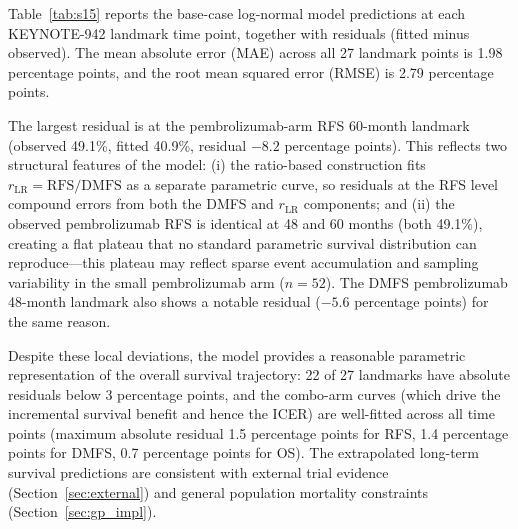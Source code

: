 \documentclass[11pt,a4paper]{article}
\begin{document}
Table~\ref{tab:s15} reports the base-case log-normal model predictions at each KEYNOTE-942 landmark time point, together with residuals (fitted minus observed). The mean absolute error (MAE) across all 27 landmark points is 1.98 percentage points, and the root mean squared error (RMSE) is 2.79 percentage points.

The largest residual is at the pembrolizumab-arm RFS 60-month landmark (observed 49.1\%, fitted 40.9\%, residual $-8.2$ percentage points). This reflects two structural features of the model: (i) the ratio-based construction fits $r_{\text{LR}} = \text{RFS}/\text{DMFS}$ as a separate parametric curve, so residuals at the RFS level compound errors from both the DMFS and $r_{\text{LR}}$ components; and (ii) the observed pembrolizumab RFS is identical at 48 and 60 months (both 49.1\%), creating a flat plateau that no standard parametric survival distribution can reproduce---this plateau may reflect sparse event accumulation and sampling variability in the small pembrolizumab arm ($n=52$). The DMFS pembrolizumab 48-month landmark also shows a notable residual ($-5.6$ percentage points) for the same reason.

Despite these local deviations, the model provides a reasonable parametric representation of the overall survival trajectory: 22 of 27 landmarks have absolute residuals below 3 percentage points, and the combo-arm curves (which drive the incremental survival benefit and hence the ICER) are well-fitted across all time points (maximum absolute residual 1.5 percentage points for RFS, 1.4 percentage points for DMFS, 0.7 percentage points for OS). The extrapolated long-term survival predictions are consistent with external trial evidence (Section~\ref{sec:external}) and general population mortality constraints (Section~\ref{sec:gp_impl}).
\end{document}
